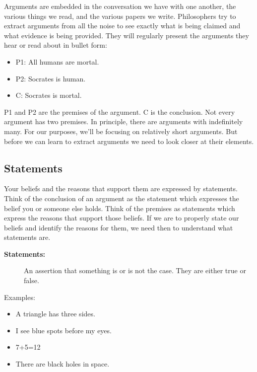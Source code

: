 \documentclass[]{article}
\providecommand{\tightlist}{%
  \setlength{\itemsep}{0pt}\setlength{\parskip}{0pt}}
\begin{document}
Arguments are embedded in the conversation we have with one another, the
various things we read, and the various papers we write. Philosophers
try to extract arguments from all the noise to see exactly what is being
claimed and what evidence is being provided. They will regularly present
the arguments they hear or read about in bullet form:

\begin{itemize}
\tightlist
\item
  P1: All humans are mortal.
\item
  P2: Socrates is human.
\item
  C: Socrates is mortal.
\end{itemize}

P1 and P2 are the premises of the argument. C is the conclusion. Not
every argument has two premises. In principle, there are arguments with
indefinitely many. For our purposes, we'll be focusing on relatively
short arguments. But before we can learn to extract arguments we need to
look closer at their elements.

\subsection{Statements}\label{statements}

Your beliefs and the reasons that support them are expressed by
statements. Think of the conclusion of an argument as the statement
which expresses the belief you or someone else holds. Think of the
premises as statements which express the reasons that support those
beliefs. If we are to properly state our beliefs and identify the
reasons for them, we need then to understand what statements are.

\begin{description}
\item[\textbf{Statements:}]
An assertion that something is or is not the case. They are either true
or false.
\end{description}

Examples:

\begin{itemize}
\tightlist
\item
  A triangle has three sides.
\item
  I see blue spots before my eyes.
\item
  7+5=12
\item
  There are black holes in space.
\end{itemize}
\end{document}
